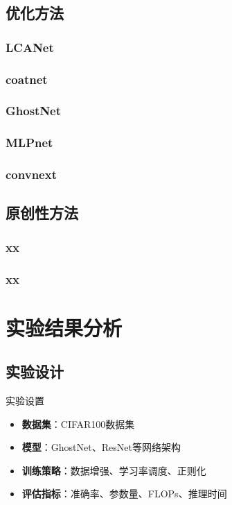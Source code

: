 \documentclass[10pt]{beamer}
\begin{document}
\subsection{优化方法}
\subsubsection{LCANet}
\subsubsection{coatnet}
\subsubsection{GhostNet}

\subsubsection{MLPnet}
\subsubsection{convnext }
\subsection{原创性方法}
\subsubsection{xx}
\subsubsection{xx}


\section{实验结果分析}
\subsection{实验设计}
\begin{frame}{实验设置}
\begin{itemize}
\item \textbf{数据集}：CIFAR100数据集
\item \textbf{模型}：GhostNet、ResNet等网络架构
\item \textbf{训练策略}：数据增强、学习率调度、正则化
\item \textbf{评估指标}：准确率、参数量、FLOPs、推理时间
\end{itemize}
\end{frame}
\end{document}
